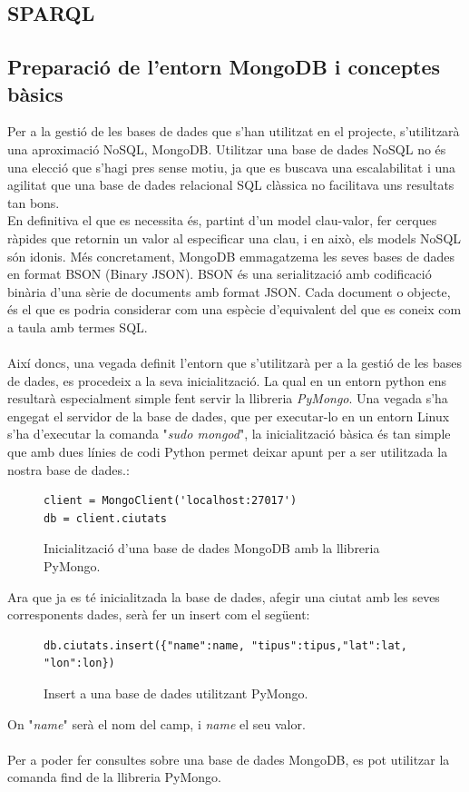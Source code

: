 \documentclass[12pt,a4paper,openright,oneside]{article}
\numberwithin{equation}{section}
\theoremstyle{definition}
\begin{document}
\subsection*{SPARQL}

\subsection{Preparació de l'entorn MongoDB i conceptes bàsics}
Per a la gestió de les bases de dades que s'han utilitzat en el projecte, s'utilitzarà una aproximació NoSQL, MongoDB. Utilitzar una base de dades NoSQL no és una elecció que s'hagi pres sense motiu, ja que es buscava una escalabilitat i una agilitat que una base de dades relacional SQL clàssica no facilitava uns resultats tan bons.\\
En definitiva el que es necessita és, partint d'un model clau-valor, fer cerques ràpides que retornin un valor al especificar una clau, i en això, els models NoSQL són idonis. Més concretament, MongoDB emmagatzema les seves bases de dades en format BSON (Binary JSON). BSON és una serialització amb codificació binària d'una sèrie de documents amb format JSON. Cada document o objecte, és el que es podria considerar com una espècie d'equivalent del que es coneix com a taula amb termes SQL. \\ \\
Així doncs, una vegada definit l'entorn que s'utilitzarà per a la gestió de les bases de dades, es procedeix a la seva inicialització. La qual en un entorn python ens resultarà especialment simple fent servir la llibreria \emph{PyMongo}. Una vegada s'ha engegat el servidor de la base de dades, que per executar-lo en un entorn Linux s'ha d'executar la comanda "\emph{sudo mongod}", la inicialització bàsica és tan simple que amb dues línies de codi Python permet deixar apunt per a ser utilitzada la nostra base de dades.:

\begin{figure}[!htbp]
\begin{verbatim}
client = MongoClient('localhost:27017')
db = client.ciutats
\end{verbatim}
\caption{Inicialització d'una base de dades MongoDB amb la llibreria PyMongo.}
\end{figure}
Ara que ja es té inicialitzada la base de dades, afegir una ciutat amb les seves corresponents dades, serà fer un insert com el següent:

\begin{figure}[!htbp]
\begin{verbatim}
db.ciutats.insert({"name":name, "tipus":tipus,"lat":lat, "lon":lon})
\end{verbatim}
\caption{Insert a una base de dades utilitzant PyMongo.}
\end{figure}
On "\emph{name}" serà el nom del camp, i \emph{name} el seu valor.\\ \\
Per a poder fer consultes sobre una base de dades MongoDB, es pot utilitzar la comanda find de la llibreria PyMongo.
\end{document}
